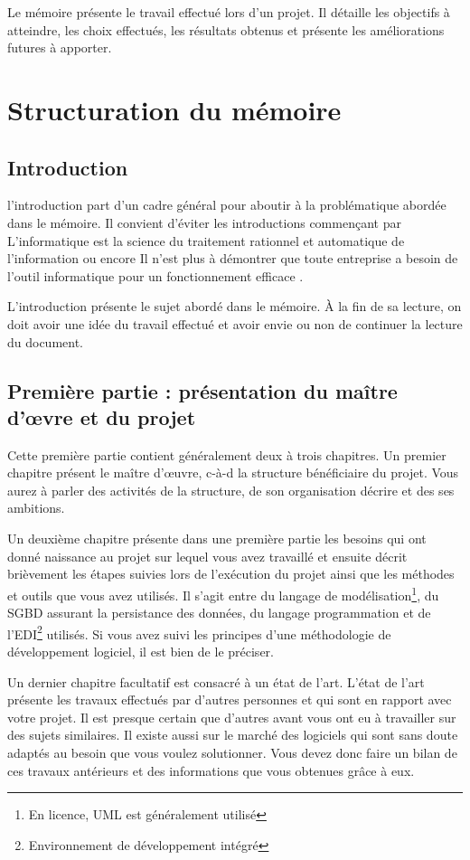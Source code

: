 \documentclass[12pt]{article}
\begin{document}
Le mémoire présente le travail effectué lors d'un projet. Il détaille les objectifs à atteindre, les choix effectués, les résultats obtenus et présente les améliorations futures à apporter.

\section{Structuration du mémoire}

\subsection{Introduction}
l'introduction part d'un cadre général pour aboutir à la problématique abordée dans le mémoire. Il convient d'éviter les introductions commençant par \og L'informatique est la science du traitement rationnel et automatique de l'information \fg{} ou encore \og Il n'est plus à démontrer que toute entreprise a besoin de l'outil informatique pour un fonctionnement efficace \fg{}.

L'introduction présente le sujet abordé dans le mémoire. \`A la fin de sa lecture, on doit avoir une idée du travail effectué et avoir envie ou non de continuer la lecture du document.

\subsection{Première partie : présentation du maître d'\oe{}vre et du projet}
Cette première partie contient généralement deux à trois chapitres. Un premier chapitre présent le maître d'\oe{}uvre, c-à-d la structure bénéficiaire du projet. Vous aurez à parler des activités de la structure, de son organisation décrire et des ses ambitions.

Un deuxième chapitre présente dans une première partie les besoins qui ont donné naissance au projet sur lequel vous avez travaillé et ensuite décrit brièvement les étapes suivies lors de l'exécution du projet ainsi que les méthodes et outils que vous avez utilisés. Il s'agit entre du langage de modélisation\footnote{En licence, UML est généralement utilisé}, du SGBD assurant la persistance des données, du langage programmation et de l'EDI\footnote{Environnement de développement intégré} utilisés. Si vous avez suivi les principes d'une méthodologie de développement logiciel, il est bien de le préciser.

Un dernier chapitre facultatif est consacré à un état de l'art. L'état de l'art présente les travaux effectués par d'autres personnes et qui sont en rapport avec votre projet. Il est presque certain que d'autres avant vous ont eu à travailler sur des sujets similaires. Il existe aussi sur le marché des logiciels qui sont sans doute adaptés au besoin que vous voulez solutionner. Vous devez donc faire un bilan de ces travaux antérieurs et des informations que vous obtenues grâce à eux.
\end{document}
